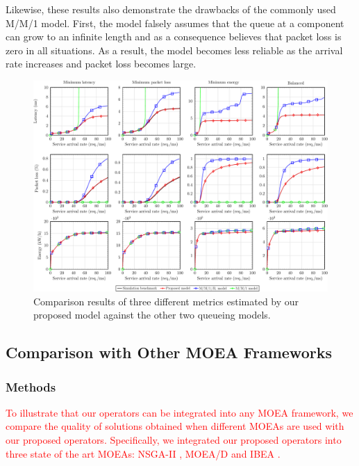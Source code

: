 Likewise, these results also demonstrate the drawbacks of the commonly used M/M/1 model. First, the model falsely assumes that the queue at a component can grow to an infinite length and as a consequence believes that packet loss is zero in all situations. As a result, the model becomes less reliable as the arrival rate increases and packet loss becomes large.

\vspace{0.5em}
\noindent
{}

\begin{figure}[t!]
    \centering
    \includegraphics[width=\linewidth]{graphs/general/model_sim-crop}
    \caption{Comparison results of three different metrics estimated by our proposed model against the other two queueing models.}
    \label{fig:model_sim}
\end{figure}

\subsection{Comparison with Other MOEA Frameworks}
\label{sec:moea_comparison}

\subsubsection{Methods}
\textcolor{red}{To illustrate that our operators can be integrated into any MOEA framework, we compare the quality of solutions obtained when different MOEAs are used with our proposed operators. Specifically, we integrated our proposed operators into three state of the art MOEAs: NSGA-II \cite{DebAPM02}, MOEA/D \cite{ZhangL07} and IBEA \cite{ZitzlerK04}.}

